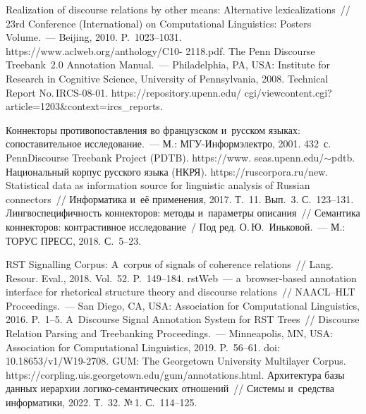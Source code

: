 \begin{multicols}{2}
{{\begin{thebibliography}{99}
 Realization of discourse relations by other means: Alternative 
lexicalizations~// 23rd Conference (International) on Computational Linguistics: Posters Volume.~--- 
Beijing, 2010. P.~1023--1031.
{\sf 
https://www.aclweb.org/anthology/C10- 2118.pdf}.
 The Penn Discourse Treebank~2.0 
Annotation Manual.~--- Philadelphia, PA, USA: Institute for 
Research in Cognitive Science, University of Pennsylvania, 2008. Technical Report No.\,IRCS-08-01.
{\sf https://repository.upenn.edu/ cgi/viewcontent.cgi?article=1203\&context=ircs\_\linebreak reports}.

 Коннекторы противопоставления во французском и~русском 
языках: сопоставительное исследование.~--- М.: МГУ-Информэлектро, 2001. 432~с.
PennDiscourse Treebank Project (PDTB). {\sf https://www. seas.upenn.edu/$\sim$pdtb}.
Национальный корпус русского языка (НКРЯ). {\sf https://ruscorpora.ru/new}.
 Statistical data as information source for linguistic analysis of Russian 
connectors~// Информатика и~её применения, 2017. Т.~11. Вып.~3. С.~123--131.
 Лингвоспецифичность коннекторов: методы и~параметры описания~// 
Семантика коннекторов: контрастивное исследование~/ Под ред. О.\,Ю.~Иньковой.~--- М.: 
ТОРУС ПРЕСС, 2018. С.~5--23.

\pagebreak

 RST Signalling Corpus: A~corpus of signals of coherence relations~// Lang. 
Resour.  Eval., 2018. Vol.~52. P.~149--184.
 rstWeb~--- a~browser-based annotation interface for rhetorical structure theory and 
discourse relations~//  NAACL--HLT Proceedings.~--- San Diego, CA, USA: Association for 
Computational Linguistics, 2016. P.~1--5.
 A~Discourse Signal Annotation System for RST Trees~//  
Discourse Relation Parsing and Treebanking Proceedings.~--- Minneapolis, MN, USA: Association for Computational 
Linguistics, 2019. P.~56--61. doi: 10.18653/v1/W19-2708. 
GUM: The Georgetown University Multilayer Corpus. {\sf 
https://corpling.uis.georgetown.edu/gum/annotations.\linebreak html}.
 Архитектура базы данных иерархии 
ло\-ги\-ко-се\-ман\-ти\-че\-ских отношений~// Сис\-те\-мы и~средства информатики, 2022. Т.~32. №\,1. 
С.~114--125.

\end{thebibliography}

 }
 }

\end{multicols}

